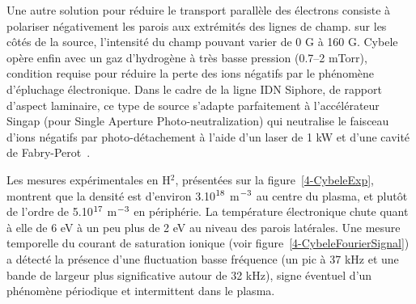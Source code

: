 \begin{refsection}
{Une autre solution pour réduire
le transport parallèle des électrons consiste à polariser négativement les
parois aux extrémités des lignes de champ.} sur les côtés de la source,
l'intensité du champ pouvant varier de 0 G à 160 G. Cybele opère enfin avec un
gaz d'hydrogène à très basse pression (0.7--2 mTorr), condition
requise pour réduire la perte des ions négatifs par le phénomène d'épluchage
électronique. Dans le cadre de la
ligne IDN Siphore, de rapport d'aspect laminaire, ce type de
source s'adapte parfaitement à l'accélérateur Singap (pour Single Aperture
Photo-neutralization) qui neutralise le faisceau d'ions négatifs
par photo-détachement à l'aide d'un laser de 1 kW et d'une cavité de
Fabry-Perot~\parencite{SimoninHDR}.

Les mesures expérimentales en H$^2$, présentées sur la figure~\ref{4-CybeleExp},
montrent que la densité est d'environ 3.10$^{{18}}$ m$^{{-3}}$ au
centre du plasma, et plutôt de l'ordre de 5.10$^{{17}}$ m$^{{-3}}$
en périphérie.
La température électronique chute quant à elle de 6 eV à un peu plus de 2 eV au niveau des parois latérales. Une mesure
temporelle du courant de saturation ionique (voir
figure~\ref{4-CybeleFourierSignal}) a détecté la présence d'une
fluctuation basse fréquence (un pic à 37 kHz et une bande de
largeur plus significative autour de 32 kHz), signe éventuel d'un phénomène
périodique et intermittent dans le plasma.


\end{refsection}
